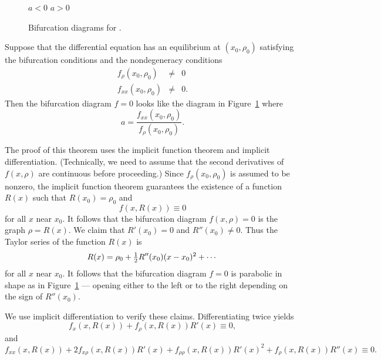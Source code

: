 \begin{figure}[htb]
           \centerline{%
	    \qquad \qquad
	   }
	 \hspace{1.0in} $a<0$ \hspace{2.8in}  $a>0$  
           \caption{Bifurcation diagrams for \protect{}.}
           \label{F:1dsaddle}
\end{figure}

\begin{thm}  \label{T:saddlenode} 
Suppose that the differential equation  has an equilibrium
at $(x_0,\rho_0)$ satisfying the bifurcation conditions 
and the nondegeneracy conditions
\begin{equation}  \label{e:nondegen1}
\begin{array}{rcl} 
f_\rho(x_0,\rho_0) & \neq & 0 \\
f_{xx}(x_0,\rho_0) & \neq & 0. 
\end{array}
\end{equation}
Then the bifurcation diagram $f=0$ looks like the diagram in 
Figure~\ref{F:1dsaddle} where 
\[
a = \frac{f_{xx}(x_0,\rho_0)}{f_\rho(x_0,\rho_0)}.
\]
\end{thm}

\proof  The proof of this theorem uses the implicit function theorem and
implicit differentiation.  (Technically, we need to assume that the second
derivatives of $f(x,\rho)$ are continuous before proceeding.) Since 
$f_\rho(x_0,\rho_0)$ is assumed to be nonzero, the implicit function theorem 
guarantees the existence of a function $R(x)$ such that $R(x_0)=\rho_0$ and
\begin{equation}  \label{e:implicit0}
f(x,R(x))\equiv 0
\end{equation}
for all $x$ near $x_0$.  It follows that the bifurcation diagram $f(x,\rho)=0$
is the graph $\rho = R(x)$.  We claim that $R'(x_0)=0$ and $R''(x_0)\neq 0$. 
Thus the Taylor series of the function $R(x)$ is
\[
R(x) = \rho_0 + \mbox{$\frac{1}{2}$} R''(x_0)(x-x_0)^2 + \cdots 
\]
for all $x$ near $x_0$.  It follows that the bifurcation diagram $f=0$ is
parabolic in shape as in Figure~\ref{F:1dsaddle} --- opening either to the 
left or to the right depending on the sign of $R''(x_0)$.

We use implicit differentiation to verify these claims. Differentiating
 twice yields 
\begin{equation}  \label{e:implicit1}
f_x(x,R(x)) + f_\rho(x,R(x))R'(x) \equiv 0,
\end{equation}
and 
\begin{equation}  \label{e:implicit2}
f_{xx}(x,R(x)) + 2f_{x\rho}(x,R(x))R'(x) + f_{\rho\rho}(x,R(x))R'(x)^2 
+ f_\rho(x,R(x))R''(x) \equiv 0.
\end{equation}

